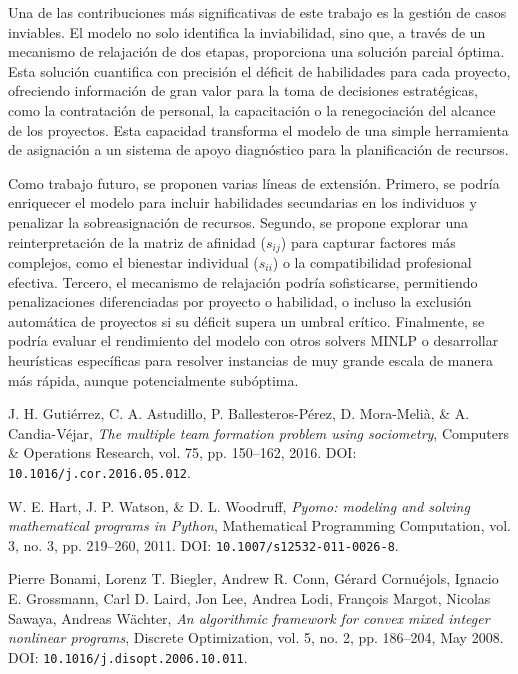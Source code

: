 \documentclass[conference]{IEEEtran}
\begin{document}
Una de las contribuciones más significativas de este trabajo es la gestión de casos inviables. El modelo no solo identifica la inviabilidad, sino que, a través de un mecanismo de relajación de dos etapas, proporciona una solución parcial óptima. Esta solución cuantifica con precisión el déficit de habilidades para cada proyecto, ofreciendo información de gran valor para la toma de decisiones estratégicas, como la contratación de personal, la capacitación o la renegociación del alcance de los proyectos. Esta capacidad transforma el modelo de una simple herramienta de asignación a un sistema de apoyo diagnóstico para la planificación de recursos.

Como trabajo futuro, se proponen varias líneas de extensión. Primero, se podría enriquecer el modelo para incluir habilidades secundarias en los individuos y penalizar la sobreasignación de recursos. Segundo, se propone explorar una reinterpretación de la matriz de afinidad ($s_{ij}$) para capturar factores más complejos, como el bienestar individual ($s_{ii}$) o la compatibilidad profesional efectiva. Tercero, el mecanismo de relajación podría sofisticarse, permitiendo penalizaciones diferenciadas por proyecto o habilidad, o incluso la exclusión automática de proyectos si su déficit supera un umbral crítico. Finalmente, se podría evaluar el rendimiento del modelo con otros solvers MINLP o desarrollar heurísticas específicas para resolver instancias de muy grande escala de manera más rápida, aunque potencialmente subóptima.


\begin{thebibliography}{00}

    J. H. Gutiérrez, C. A. Astudillo, P. Ballesteros-Pérez, D. Mora-Melià, \& A. Candia-Véjar,
    \textit{The multiple team formation problem using sociometry},
    Computers \& Operations Research, vol. 75, pp. 150--162, 2016. DOI: \texttt{10.1016/j.cor.2016.05.012}.

    W. E. Hart, J. P. Watson, \& D. L. Woodruff,
    \textit{Pyomo: modeling and solving mathematical programs in Python},
    Mathematical Programming Computation, vol. 3, no. 3, pp. 219--260, 2011. DOI: \texttt{10.1007/s12532-011-0026-8}.


    Pierre Bonami, Lorenz T. Biegler, Andrew R. Conn, Gérard Cornuéjols, Ignacio E. Grossmann, Carl D. Laird, Jon Lee, Andrea Lodi, François Margot, Nicolas Sawaya, Andreas Wächter,
    \textit{An algorithmic framework for convex mixed integer nonlinear programs},
    Discrete Optimization, vol. 5, no. 2, pp. 186--204, May 2008. DOI: \texttt{10.1016/j.disopt.2006.10.011}.

\end{thebibliography}
\end{document}
